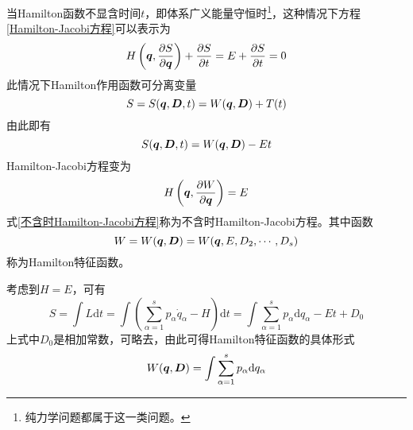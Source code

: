 当Hamilton函数不显含时间$t$，即体系广义能量守恒时\footnote{纯力学问题都属于这一类问题。}，这种情况下方程\eqref{Hamilton-Jacobi方程}可以表示为
\begin{equation}
	H\left(\boldsymbol{q},\frac{\partial S}{\partial \boldsymbol{q}}\right) + \frac{\partial S}{\partial t} = E + \frac{\partial S}{\partial t} = 0
\end{equation}
此情况下Hamilton作用函数可分离变量
\begin{equation*}
	S = S(\boldsymbol{q},\boldsymbol{D},t) = W(\boldsymbol{q},\boldsymbol{D}) + T(t)
\end{equation*}
由此即有
\begin{equation}
	S(\boldsymbol{q},\boldsymbol{D},t) = W(\boldsymbol{q},\boldsymbol{D}) - Et
\end{equation}
Hamilton-Jacobi方程变为
\begin{equation}
	H\left(\boldsymbol{q},\frac{\partial W}{\partial \boldsymbol{q}}\right) = E
	\label{不含时Hamilton-Jacobi方程}
\end{equation}
式\eqref{不含时Hamilton-Jacobi方程}称为{\heiti 不含时Hamilton-Jacobi方程}。其中函数
\begin{equation*}
	W = W(\boldsymbol{q},\boldsymbol{D}) = W(\boldsymbol{q},E,D_2,\cdots,D_s)
\end{equation*}
称为{\heiti Hamilton特征函数}。

考虑到$H=E$，可有
\begin{equation*}
	S = \int L \mathrm{d} t = \int \left(\sum_{\alpha=1}^s p_\alpha \dot{q}_\alpha - H\right) \mathrm{d} t = \int \sum_{\alpha=1}^s p_\alpha \mathrm{d} q_\alpha - Et + D_0
\end{equation*}
上式中$D_0$是相加常数，可略去，由此可得Hamilton特征函数的具体形式
\begin{equation}
	W(\boldsymbol{q},\boldsymbol{D}) = \int \sum_{\alpha=1}^s p_\alpha \mathrm{d} q_\alpha
\end{equation}

